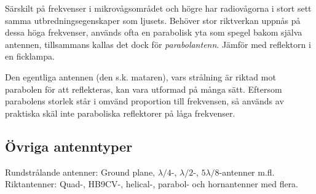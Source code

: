 Särskilt på frekvenser i mikrovågsområdet och högre har radiovågorna i
stort sett samma utbredningsegenskaper som ljusets.
Behöver stor riktverkan uppnås på dessa höga frekvenser, används ofta en
parabolisk yta som spegel bakom själva antennen, tillsammans kallas det dock
för \emph{parabolantenn}.
Jämför med reflektorn i en ficklampa.

Den egentliga antennen (den s.k. mataren), vars strålning är riktad
mot parabolen för att reflekteras, kan vara utformad på många sätt.
Eftersom parabolens storlek står i omvänd proportion till frekvensen, så
används av praktiska skäl inte paraboliska reflektorer på låga frekvenser.

\subsection{Övriga antenntyper}

Rundstrålande antenner: Ground plane, \(\lambda/4\)-, \(\lambda/2\)-,
\(5\lambda/8\)-antenner m.fl.
Riktantenner: Quad-, HB9CV-, helical-, parabol- och hornantenner med flera.
